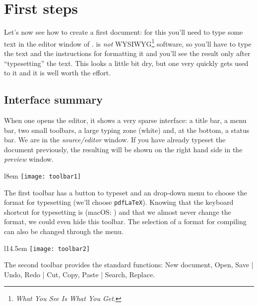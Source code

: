 
\chapter{First steps}
\label{chap:first-steps}

Let's now see how to create a first document: for this you'll need to type some text in the editor window of {\Tw}. {\AllTeX} is \emph{not} WYSIWYG\footnote{\emph{What You See Is What You Get}.} software, so you'll have to type the text and the instructions for formatting it and you'll see the result only after ``typesetting'' the text. This looks a little bit dry, but one very quickly gets used to it and it is well worth the effort.

\section{Interface summary}

When one opens the editor, it shows a very sparse interface: a title bar, a menu bar, two small toolbars, a large typing zone (white) and, at the bottom, a status bar. We are in the \emph{source/editor} window. If you have already typeset the document previously, the resulting  will be shown on the right hand side in the \emph{preview} window.
\vspace{10pt}

\begin{wrapfigure}[2]{l}{8em}
\vspace*{-1em}
\texttt{[image: toolbar1]}
\end{wrapfigure}
\noindent The first toolbar has a button to typeset and an drop-down menu to choose the format for typesetting (we'll choose \verb+pdfLaTeX+). Knowing that the keyboard shortcut for typesetting is  (macOS: ) and that we almost never change the format, we could even hide this toolbar. The selection of a format for compiling can also be changed through the  menu.
\vspace{10pt}

\begin{wrapfigure}[2]{l}{14.5em}
\vspace*{-1em}
\texttt{[image: toolbar2]}
\end{wrapfigure}
\noindent The second toolbar provides the standard functions: New document, Open, Save | Undo, Redo | Cut, Copy, Paste | Search, Replace.

